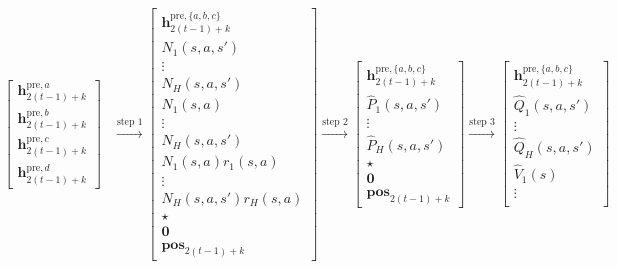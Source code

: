 \documentclass[10pt]{article}
\newcommand{\<}{\left\langle}
\renewcommand{\>}{\right\rangle}
\newcommand{\bzero}{{\mathbf 0}}
\newcommand{\pre}{{\mathrm{pre}}}
\newcommand{\posv}{{\mathbf{pos}}}
\newcommand{\parta}{{a}}
\newcommand{\partb}{{b}}
\newcommand{\partc}{{c}}
\newcommand{\partd}{{d}}
\newcommand{\state}{{s}}
\newcommand{\action}{{a}}
\newcommand{\reward}{{r}}
\newcommand{\horizon}{{H}}
\renewcommand{\horizon}{{H}}
\newcommand{\esttransit}{\widehat{P}}
\newcommand{\valuefun}{{V}}
\newcommand{\Numvi}{{N}}
\newcommand{\Qfun}{{Q}}
\newcommand{\estQfun}{{\widehat{\Qfun}}}
\newcommand{\Vfun}{{\valuefun}}
\newcommand{\estVfun}{{\widehat{\Vfun}}}
\def\bh{{\mathbf h}}
\begin{document}
\begin{align}
    \begin{bmatrix}
    \bh_{2(t-1)+k}^{\pre,\parta} \\  \bh_{2(t-1)+k}^{\pre,\partb}\\  \bh_{2(t-1)+k}^{\pre,\partc}\\   \bh_{2(t-1)+k}^{\pre,\partd}
\end{bmatrix}&
\xrightarrow{\text{step 1}}
   \begin{bmatrix}
    \bh_{2(t-1)+k}^{\pre,\{\parta,\partb,\partc\}} \\
        \Numvi_{1}(\state,\action,\state') \\ \vdots \\
         \Numvi_{\horizon}(\state,\action,\state')
         \\
        \Numvi_{1}(\state,\action) \\\vdots\\
        \Numvi_{\horizon}(\state,\action,\state')
         \\
         \Numvi_{1}(\state,\action)\reward_{1}(\state,\action) \\\vdots\\
        \Numvi_{\horizon}(\state,\action,\state') \reward_{\horizon}(\state,\action)
         \\
         \star\\ \bzero \\\posv_{2(t-1)+k}
\end{bmatrix}
\xrightarrow{\text{step 2}}
\begin{bmatrix}
    \bh_{2(t-1)+k}^{\pre,\{\parta,\partb,\partc\}} \\
         \esttransit_{1}(\state,\action,\state') \\ \vdots \\
         \esttransit_{\horizon}(\state,\action,\state')  \\ \star
        \\ \bzero \\\posv_{2(t-1)+k}
\end{bmatrix}
\xrightarrow{\text{step 3}}
\begin{bmatrix}
    \bh_{2(t-1)+k}^{\pre,\{\parta,\partb,\partc\}} \\
         \estQfun_{1}(\state,\action,\state') \\ \vdots \\
         \estQfun_{\horizon}(\state,\action,\state')  \\
           \estVfun_{1}(\state) \\ \vdots \\

\end{bmatrix}
\end{align}
\end{document}
